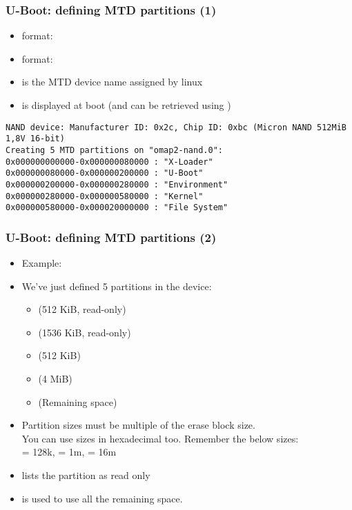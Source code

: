 \begin{frame}[fragile]
  \frametitle{U-Boot: defining MTD partitions (1)}
  \begin{itemize}
  \item {} format: 
  \item {} format: 
  \item {} is the MTD device name assigned by linux
  \item {} is displayed at boot (and can be retrieved using
    )
  \end{itemize}
\tiny
\begin{verbatim}
NAND device: Manufacturer ID: 0x2c, Chip ID: 0xbc (Micron NAND 512MiB 1,8V 16-bit)
Creating 5 MTD partitions on "omap2-nand.0":
0x000000000000-0x000000080000 : "X-Loader"
0x000000080000-0x000000200000 : "U-Boot"
0x000000200000-0x000000280000 : "Environment"
0x000000280000-0x000000580000 : "Kernel"
0x000000580000-0x000020000000 : "File System"
\end{verbatim}
\end{frame}

\begin{frame}
  \frametitle{U-Boot: defining MTD partitions (2)}
  \begin{itemize}
  \item Example:\\
  \item We've just defined 5 partitions in the  device:
    \begin{itemize}
    \item {} (512 KiB, read-only)
    \item {} (1536 KiB, read-only)
    \item {} (512 KiB)
    \item {} (4 MiB)
    \item {} (Remaining space)
    \end{itemize}
  \item Partition sizes must be multiple of the erase block size.\\
    You can use sizes in hexadecimal too. Remember the below sizes:\\
     = 128k,  = 1m,  = 16m
  \item {} lists the partition as read only
  \item \code{-} is used to use all the remaining space.
  \end{itemize}
\end{frame}

